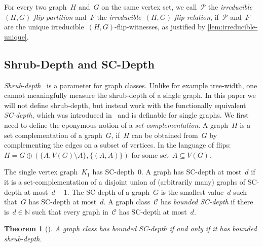 \documentclass[11pt]{article}      \usepackage[margin=1in]{geometry}  \usepackage{microtype}
\newtheorem{theorem}{Theorem}[section]
\theoremstyle{definition}
\newcommand{\N}[0]{\mathrm{\mathbb{N}}}
\newcommand{\CC}{\mathcal{C}}
\newcommand{\PP}{\mathcal{P}}
\begin{document}
For every two graph~$H$ and~$G$ on the same vertex set, we call~$\PP$ the \emph{irreducible~$(H,G)$-flip-partition} and~$F$ the \emph{irreducible~$(H,G)$-flip-relation}, if~$\PP$ and~$F$ are the unique irreducible~$(H,G)$-flip-witnesses, as justified by \cref{lem:irreducible-unique}. 

\subsection{Shrub-Depth and SC-Depth}
\emph{Shrub-depth}~\cite{shrubdepth,shrubdepth-journal} is a parameter for graph classes.
Unlike for example tree-width, one cannot meaningfully measure the shrub-depth of a single graph.
In this paper we will not define shrub-depth, but instead work with the functionally equivalent \emph{SC-depth}, which was introduced in~\cite{shrubdepth} and is definable for single graphs.
We first need to define the eponymous notion of a \emph{set-complementation}.
A graph~$H$ is a set complementation of a graph~$G$, if~$H$ can be obtained from~$G$ by complementing the edges on a subset of vertices. In the language of flips:
$H = G \oplus (\{A, V(G)\setminus A\}, \{(A,A)\})$ for some set~$A\subseteq V(G)$.

The single vertex graph~$K_1$ has SC-depth~$0$.
A graph has SC-depth at most~$d$ if it is a set-complementation of a disjoint union of (arbitrarily many) graphs of SC-depth at most~$d-1$.
The SC-depth of a graph~$G$ is the smallest value~$d$ such that~$G$ has SC-depth at most~$d$.
A graph class~$\CC$ has \emph{bounded SC-depth} if there is~$d\in\N$ such that every graph in~$\CC$ has SC-depth at most~$d$.

\begin{theorem}[\cite{shrubdepth}]\label{thm:sc-depth}
    A graph class has bounded SC-depth if and only if it has bounded shrub-depth.
\end{theorem}
\end{document}
